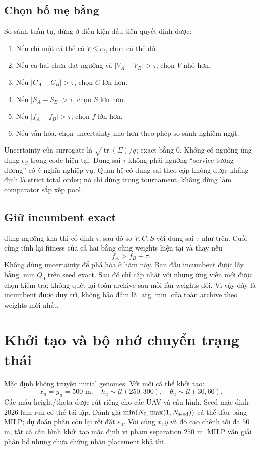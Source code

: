 \documentclass[11pt,a4paper]{article}
\newcommand{\code}[1]{\texttt{\detokenize{#1}}}
\begin{document}
\subsection{Chọn bố mẹ bằng \code{_better()}}
So sánh tuần tự, dừng ở điều kiện đầu tiên quyết định được:
\begin{enumerate}
\item Nếu chỉ một cá thể có $V\le e_t$, chọn cá thể đó.
\item Nếu cả hai chưa đạt ngưỡng và $|V_A-V_B|>\tau$, chọn $V$ nhỏ hơn.
\item Nếu $|C_A-C_B|>\tau$, chọn $C$ lớn hơn.
\item Nếu $|S_A-S_B|>\tau$, chọn $S$ lớn hơn.
\item Nếu $|f_A-f_B|>\tau$, chọn $f$ lớn hơn.
\item Nếu vẫn hòa, chọn uncertainty nhỏ hơn theo phép so sánh nghiêm ngặt.
\end{enumerate}
Uncertainty của surrogate là $\sqrt{\operatorname{tr}(\Sigma)/q}$; exact bằng $0$.
Không có ngưỡng ứng dụng $\epsilon_S$ trong code hiện tại. Dung sai $\tau$ không phải ngưỡng ``service tương đương'' có ý nghĩa nghiệp vụ.
Quan hệ có dung sai theo cặp không được khẳng định là strict total order; nó chỉ dùng trong tournament, không dùng làm comparator sắp xếp pool.

\subsection{Giữ incumbent exact}
\code{_better_exact_incumbent()} dùng ngưỡng khả thi cố định $\tau$, sau đó so $V,C,S$ với dung sai $\tau$ như trên.
Cuối cùng tính lại fitness của cả hai bằng cùng weights hiện tại và thay nếu
\[
f_A>f_B+\tau.
\]
Không dùng uncertainty để phá hòa ở hàm này.
Ban đầu incumbent được lấy bằng $\min Q_0$ trên seed exact. Sau đó chỉ cập nhật với những ứng viên mới được chọn kiểm tra; không quét lại toàn archive sau mỗi lần weights đổi.
Vì vậy đây là incumbent được duy trì, không bảo đảm là $\arg\min$ của toàn archive theo weights mới nhất.

\section{Khởi tạo và bộ nhớ chuyển trạng thái}
Mặc định \code{main.py} không truyền initial genomes. Với mỗi cá thể khởi tạo:
\[
x_u=y_u=500\text{ m},\quad h_u\sim\mathcal U(250,300),\quad
\theta_u\sim\mathcal U(30,60).
\]
Các mẫu height/theta được rút riêng cho các UAV và cấu hình. Seed mặc định $2026$ làm run có thể tái lập.
Đánh giá $\min(N_0,\max(1,N_{\rm seed}))$ cá thể đầu bằng MILP; dự đoán phần còn lại rồi đặt $\varepsilon_0$.
Với cùng $x,y$ và độ cao chênh tối đa $50$ m, tất cả cấu hình khởi tạo mặc định vi phạm separation $250$ m. MILP vẫn giải phân bổ nhưng chưa chứng nhận placement khả thi.
\end{document}
